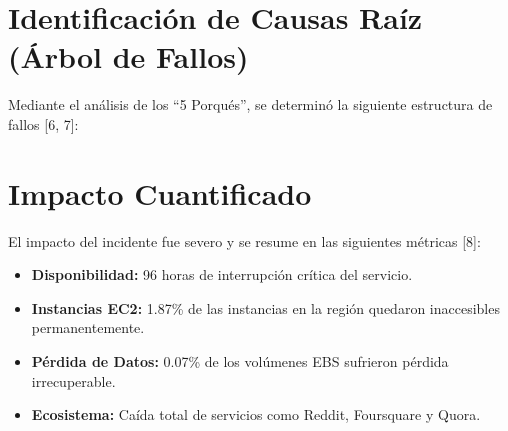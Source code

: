 \documentclass[12pt,a4paper]{article}
\begin{document}
\section{Identificación de Causas Raíz (Árbol de Fallos)}
Mediante el análisis de los ``5 Porqués'', se determinó la siguiente estructura de fallos [6, 7]:

\begin{center}
\end{center}

\section{Impacto Cuantificado}
El impacto del incidente fue severo y se resume en las siguientes métricas [8]:
\begin{itemize}[noitemsep]
    \item \textbf{Disponibilidad:} 96 horas de interrupción crítica del servicio.
    \item \textbf{Instancias EC2:} 1.87\% de las instancias en la región quedaron inaccesibles permanentemente.
    \item \textbf{Pérdida de Datos:} 0.07\% de los volúmenes EBS sufrieron pérdida irrecuperable.
    \item \textbf{Ecosistema:} Caída total de servicios como Reddit, Foursquare y Quora.
\end{itemize}
\end{document}
